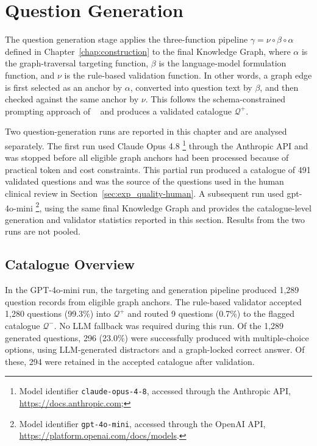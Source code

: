 \section{Question Generation}
\label{sec:exp_questions}

The question generation stage applies the three-function pipeline
$\gamma = \nu \circ \beta \circ \alpha$ defined in
Chapter~\ref{chap:construction} to the final Knowledge Graph,
where $\alpha$ is the graph-traversal targeting function,
$\beta$ is the language-model formulation function, and $\nu$ is
the rule-based validation function. In other words, a graph edge is
first selected as an anchor by $\alpha$, converted into question text
by $\beta$, and then checked against the same anchor by $\nu$.
This follows the schema-constrained prompting approach of
~\cite{caufield2024} and produces a validated catalogue
$\mathcal{Q}^+$.

Two question-generation runs are reported in this chapter and are analysed separately. The first run used Claude Opus 4.8 \footnote{Model identifier \texttt{claude-opus-4-8}, accessed through the Anthropic API, \url{https://docs.anthropic.com};}
 through the Anthropic API and was stopped before all eligible graph anchors had been processed because of practical token and cost constraints. This partial run produced a catalogue of 491 validated questions and was the source of the questions used in the human clinical review in Section~\ref{sec:exp_quality-human}. A subsequent run used gpt-4o-mini \footnote{Model identifier \texttt{gpt-4o-mini}, accessed through the OpenAI API, \url{https://platform.openai.com/docs/models}.}, using
the same final Knowledge Graph and provides the catalogue-level generation and validator statistics reported in this section. Results from the two runs are not pooled.

\subsection{Catalogue Overview}
\label{sec:q-overview}

In the GPT-4o-mini run, the targeting and generation pipeline produced 1,289 question records from eligible graph anchors. The rule-based validator accepted 1,280 questions (99.3\%) into \(\mathcal{Q}^+\) and routed 9 questions (0.7\%) to the flagged catalogue \(\mathcal{Q}^-\). No LLM fallback was required during this run. Of the 1,289 generated questions, 296 (23.0\%) were successfully produced with multiple-choice options, using LLM-generated distractors and a graph-locked correct answer. Of these, 294 were retained in the accepted catalogue after validation.


